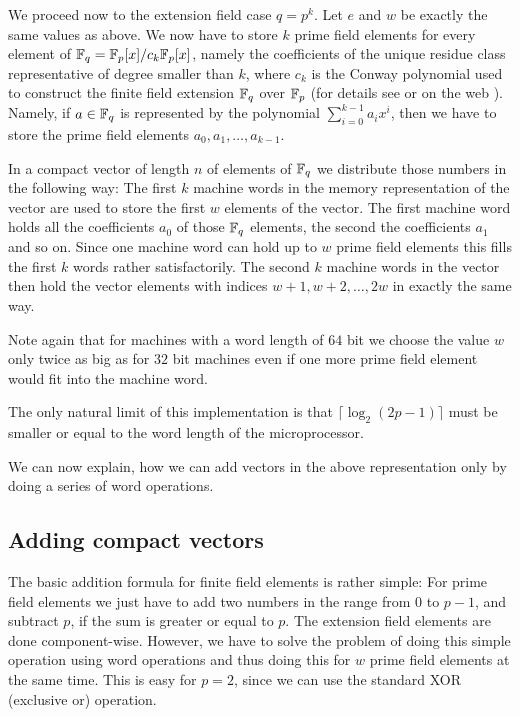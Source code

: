 We proceed now to the extension field case $q=p^k$. Let $e$ and $w$ be
exactly the same values as above. We now have to store $k$ prime field
elements for every element of $\mathbb{F}_q = \mathbb{F}_p[x]/c_k\mathbb{F}_p[x]$, namely the 
coefficients of the unique residue class representative of degree smaller 
than $k$, where $c_k$ is the Conway polynomial used to construct the 
finite field extension $\mathbb{F}_q$ over $\mathbb{F}_p$ (for details see \cite{Nickel}
or on the web \cite{ConwayFL}). Namely, if $a \in \mathbb{F}_q$ is represented by
the polynomial $\sum_{i=0}^{k-1} a_i x^i$, then we have to store the prime 
field elements $a_0, a_1, \ldots, a_{k-1}$. 

In a compact vector of length $n$ of elements of $\mathbb{F}_q$ we distribute
those numbers in the following way: The first $k$ machine words in the
memory representation of the vector are used to store the first $w$
elements of the vector. The first machine word holds all the coefficients
$a_0$ of those $\mathbb{F}_q$ elements, the second the coefficients $a_1$ and so
on. Since one machine word can hold up to $w$ prime field elements this
fills the first $k$ words rather satisfactorily. The second $k$ machine words
in the vector then hold the vector elements with indices 
$w+1, w+2, \ldots, 2w$ in exactly the same way.

Note again that for machines with a word length of $64$ bit we choose the
value $w$ only twice as big as for $32$ bit machines even if one more
prime field element would fit into the machine word.

The only natural limit of this implementation is that 
$\lceil \log_2(2p-1) \rceil$ must be smaller or equal to the word length
of the microprocessor.

We can now explain, how we can add vectors in the above representation
only by doing a series of word operations.

\subsection{Adding compact vectors}

The basic addition formula for finite field elements is rather simple:
For prime field elements we just have to add two numbers in the range 
from $0$ to $p-1$, and
subtract $p$, if the sum is greater or equal to $p$. The extension
field elements are done component-wise. However, we have to solve
the problem of doing this simple operation using word operations and 
thus doing this for $w$ prime field elements at the same time.
This is easy for $p=2$, since we can use the standard XOR (exclusive or)
operation.

